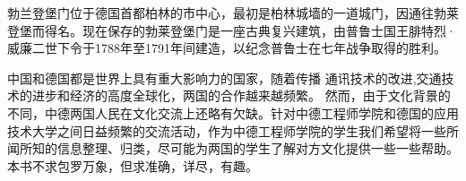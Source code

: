 \vspace*{3cm}
\begin{minipage}{\linewidth}
    \Huge\heiti{} \par
\end{minipage}

 \vspace*{3cm}

\par
勃兰登堡门位于德国首都柏林的市中心，最初是柏林城墙的一道城门，因通往勃莱登堡而得名。现在保存的勃莱登堡门是一座古典复兴建筑，由普鲁士国王腓特烈·威廉二世下令于1788年至1791年间建造，以纪念普鲁士在七年战争取得的胜利。
\cleardoublepage

\begin{minipage}{\linewidth}
\Huge\heiti{} \par
\end{minipage}

\vspace*{3cm}
中国和德国都是世界上具有重大影响力的国家，随着传播 通讯技术的改进,交通技术的进步和经济的高度全球化，两国的合作越来越频繁。 然而，由于文化背景的不同，中德两国人民在文化交流上还略有欠缺。针对中德工程师学院和德国的应用技术大学之间日益频繁的交流活动，作为中德工程师学院的学生我们希望将一些所闻所知的信息整理、归类，尽可能为两国的学生了解对方文化提供一些一些帮助。本书不求包罗万象，但求准确，详尽，有趣。

